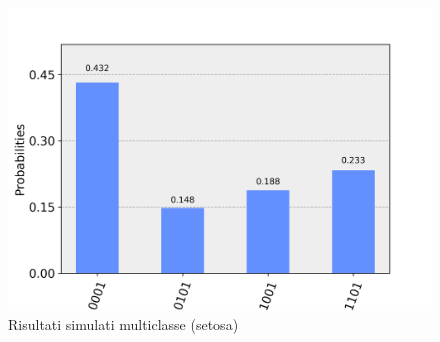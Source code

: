 \begin{figure}[h]
    \centering
    \includegraphics[width=\linewidth]{gfx/setosa_simulato_multiclasse.png}
    \caption{Risultati simulati multiclasse (setosa)}
    \label{fig:classificazione.multiclasse.simulata}
\end{figure}




